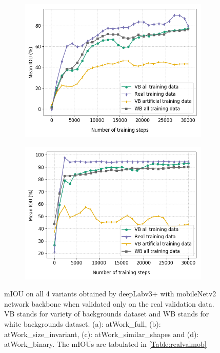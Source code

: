 \begin{figure}
\begin{subfigure}{.5\textwidth}
			\includegraphics[width=1\linewidth]{images/re_val_mob_shape}
			\caption{}
		\end{subfigure}
		\begin{subfigure}{.5\textwidth}
			\centering
			\includegraphics[width=1\linewidth]{images/re_val_mob_binary}
			\caption{}
		\end{subfigure}
		\caption{mIOU on all 4 variants obtained by deepLabv3+ with mobileNetv2 network backbone when validated only on the real validation data. VB stands for variety of backgrounds dataset and WB stands for white backgrounds dataset. (a): atWork\_full, (b): atWork\_size\_invariant, (c): atWork\_similar\_shapes and (d): atWork\_binary. The mIOUs are tabulated in \ref{Table:realvalmob}}
		\label{Fig:realvalmob}
	\end{figure}

